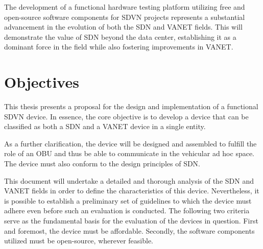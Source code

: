 The development of a functional hardware testing platform utilizing free and open-source software components for SDVN projects represents a substantial advancement in the evolution of both the SDN and VANET fields. This will demonstrate the value of SDN beyond the data center, establishing it as a dominant force in the field while also fostering improvements in VANET.


\section{Objectives} %
\label{sec:objectives}


This thesis presents a proposal for the design and implementation of a functional SDVN device. In essence, the core objective is to develop a device that can be classified as both a SDN and a VANET device in a single entity. 

As a further clarification, the device will be designed and assembled to fulfill the role of an OBU and thus be able to communicate in the  vehicular ad hoc space. The device must also conform to the design principles of SDN.

This document will undertake a detailed and thorough analysis of the SDN and VANET fields in order to define the characteristics of this device. Nevertheless, it is possible to establish a preliminary set of guidelines to which the device must adhere even before such an evaluation is conducted. The following two criteria serve as the fundamental basis for the evaluation of the devices in question. First and foremost, the device must be affordable. Secondly, the software components utilized must be open-source, wherever feasible.




